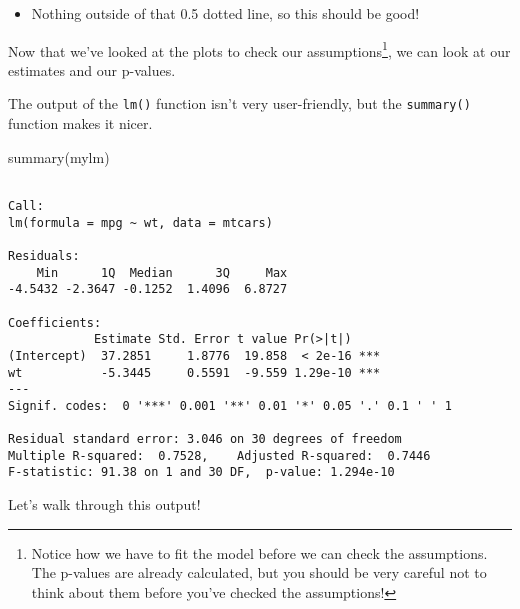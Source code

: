 \documentclass[
  letterpaper,
  DIV=11,
  numbers=noendperiod]{scrreprt}
\newenvironment{Shaded}{\begin{snugshade}}{\end{snugshade}}
\newcommand{\FunctionTok}[1]{\textcolor[rgb]{0.28,0.35,0.67}{#1}}
\newcommand{\NormalTok}[1]{\textcolor[rgb]{0.00,0.23,0.31}{#1}}
\providecommand{\tightlist}{%
  \setlength{\itemsep}{0pt}\setlength{\parskip}{0pt}}\usepackage{longtable,booktabs,array}
\begin{document}
\begin{enumerate}
  \begin{itemize}
  \tightlist
  \item
    Nothing outside of that 0.5 dotted line, so this should be good!
  \end{itemize}
\end{enumerate}

Now that we've looked at the plots to check our assumptions\footnote{Notice
  how we have to fit the model before we can check the assumptions. The
  p-values are already calculated, but you should be very careful not to
  think about them before you've checked the assumptions!}, we can look
at our estimates and our p-values.

The output of the \texttt{lm()} function isn't very user-friendly, but
the \texttt{summary()} function makes it nicer.

\begin{Shaded}
\begin{Highlighting}[]
\FunctionTok{summary}\NormalTok{(mylm)}
\end{Highlighting}
\end{Shaded}

\begin{verbatim}

Call:
lm(formula = mpg ~ wt, data = mtcars)

Residuals:
    Min      1Q  Median      3Q     Max 
-4.5432 -2.3647 -0.1252  1.4096  6.8727 

Coefficients:
            Estimate Std. Error t value Pr(>|t|)    
(Intercept)  37.2851     1.8776  19.858  < 2e-16 ***
wt           -5.3445     0.5591  -9.559 1.29e-10 ***
---
Signif. codes:  0 '***' 0.001 '**' 0.01 '*' 0.05 '.' 0.1 ' ' 1

Residual standard error: 3.046 on 30 degrees of freedom
Multiple R-squared:  0.7528,    Adjusted R-squared:  0.7446 
F-statistic: 91.38 on 1 and 30 DF,  p-value: 1.294e-10
\end{verbatim}

Let's walk through this output!
\end{document}
